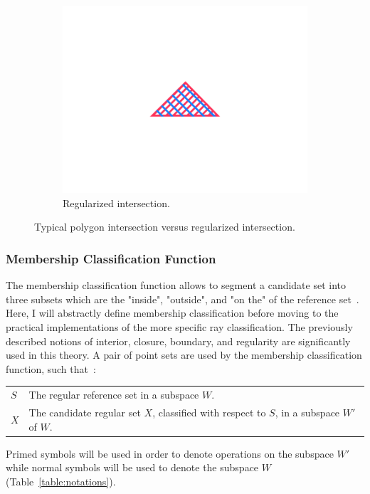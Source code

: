 \documentclass[a4paper,11pt,oneside]{article}
\makeatletter
\newenvironment{conditions}
  {\par\vspace{\abovedisplayskip}\noindent\begin{tabular}{>{$}l<{$} @{${}={}$} l}}
  {\end{tabular}\par\vspace{\belowdisplayskip}}
\makeatother
\begin{document}
\begin{figure}[ht]
\begin{subfigure}[b]{0.3\textwidth}
		\centering
		\includegraphics[width=\textwidth]{section3/3.2/regularization-regular.png}
		\caption{Regularized intersection.}
		\label{sec3.2:regular-intersection}
	\end{subfigure}
	\caption{Typical polygon intersection versus regularized intersection.}
	\label{sec3.2:regularity}
\end{figure}
   
\subsubsection{Membership Classification Function}
The membership classification function allows to segment a candidate set into three subsets which are the "inside", "outside", and "on the" of the reference set~\cite{tilove1977a}. Here, I will abstractly define membership classification before moving to the practical implementations of the more specific ray classification.
The previously described notions of interior, closure, boundary, and regularity are significantly used in this theory. A pair of point sets are used by the membership classification function, such that~\cite{tilove1977a}:

\begin{conditions}
	S     &  The regular reference set in a subspace $W$. \\
	X     &  The candidate regular set $X$, classified with respect to $S$, in a subspace $W'$ of $W$. \\
\end{conditions}

Primed symbols will be used	in order to denote operations on the subspace $W'$ while normal symbols will be used to denote the subspace $W$ (Table~\ref{table:notations}).
 
\end{document}
